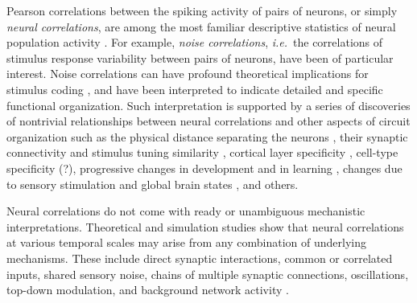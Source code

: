 Pearson correlations between the spiking activity of pairs of neurons, or simply \emph{neural correlations}, are among the most familiar descriptive statistics of neural population activity \citep{Averbeck:2006,Zohary:1994,Kohn:2005,Bair:2001,Renart:2010}.  For example, \emph{noise correlations}, \emph{i.e.}~the correlations of stimulus response variability between pairs of neurons, have been of particular interest.  Noise correlations can have profound theoretical implications for stimulus coding \citep{Zohary:1994,Abbott:1999,Averbeck:2006,Berens:2011,Ecker:2011}, and have been interpreted to indicate detailed and specific functional organization. Such interpretation is supported by a series of discoveries of nontrivial relationships between neural correlations and other aspects of circuit organization such as the physical distance separating the neurons \citep{Smith:2008,Denman:2013}, their synaptic connectivity and stimulus tuning similarity \citep{Kohn:2005,Ko:2011}, cortical layer specificity \citep{Hansen:2012,Smith:2013}, cell-type specificity (?), progressive changes in development and in learning \citep{Golshani:2009}, changes due to sensory stimulation and global brain states \citep{Goard:2009,Kohn:2009,Ecker:2010,Renart:2010}, and others.

Neural correlations do not come with ready or unambiguous mechanistic interpretations.  Theoretical and simulation studies show that neural correlations at various temporal scales may arise from any combination of underlying mechanisms.  These include direct synaptic interactions, common or correlated inputs, shared sensory noise, chains of multiple synaptic connections, oscillations, top-down modulation, and background network activity \citep{Perkel:1967b,Shadlen:1998,Salinas:2001,Ostojic:2009,Rosenbaum:2011}.


